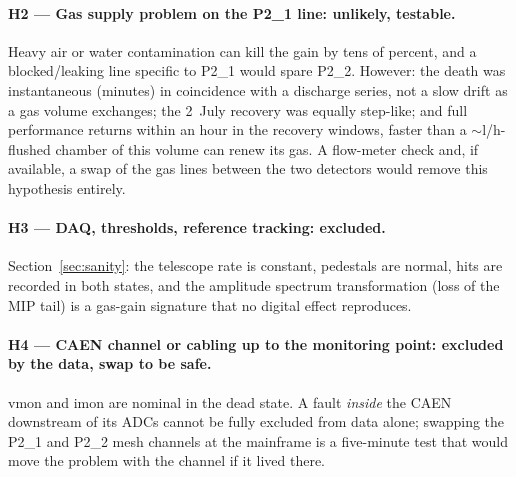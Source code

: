 \documentclass[11pt,a4paper]{article}
\newcommand{\detone}{P2\_1}
\newcommand{\dettwo}{P2\_2}
\begin{document}
\paragraph{H2 --- Gas supply problem on the \detone{} line: unlikely,
testable.} Heavy air or water contamination can kill the gain by tens of
percent, and a blocked/leaking line specific to \detone{} would spare
\dettwo. However: the death was instantaneous (minutes) in coincidence with
a discharge series, not a slow drift as a gas volume exchanges; the 2~July
recovery was equally step-like; and full performance returns within an hour
in the recovery windows, faster than a $\sim$l/h-flushed chamber of this
volume can renew its gas. A flow-meter check and, if available, a swap of the
gas lines between the two detectors would remove this hypothesis entirely.

\paragraph{H3 --- DAQ, thresholds, reference tracking: excluded.}
Section~\ref{sec:sanity}: the telescope rate is constant, pedestals are
normal, hits are recorded in both states, and the amplitude spectrum
transformation (loss of the MIP tail) is a gas-gain signature that no
digital effect reproduces.

\paragraph{H4 --- CAEN channel or cabling up to the monitoring point:
excluded by the data, swap to be safe.} vmon and imon are nominal in the
dead state. A fault \emph{inside} the CAEN downstream of its ADCs cannot be
fully excluded from data alone; swapping the \detone{} and \dettwo{} mesh
channels at the mainframe is a five-minute test that would move the problem
with the channel if it lived there.
\end{document}
